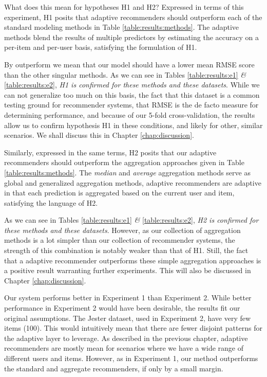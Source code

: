 What does this mean for hypotheses H1 and H2?
Expressed in terms of this experiment,
H1 posits that adaptive recommenders should outperform each of the standard modeling methods
in Table \ref{table:results:methods}.
The adaptive methods blend the results of multiple predictors by estimating the accuracy
on a per-item and per-user basis, satisfying the formulation of H1.

By outperform we mean that our model should have a lower
mean RMSE score than the other singular methods. As we can see in Tables \ref{table:results:e1} \emph{\&} \ref{table:results:e2},
\emph{H1 is confirmed for these methods and these datasets}.
While we can not generalize too much on this basis, 
the fact that this dataset is a common testing ground for recommender systems,
that RMSE is the de facto measure for determining performance,
and because of our 5-fold cross-validation, the results allow us 
to confirm hypothesis H1 in these conditions, and likely for other, similar scenarios.
We shall discuss this in Chapter \ref{chap:discussion}.

Similarly, expressed in the same terms, H2 posits that 
our adaptive recommenders should outperform the aggregation approaches
given in Table \ref{table:results:methods}.
The \emph{median} and \emph{average} aggregation methods
serve as global and generalized aggregation methods,
adaptive recommenders are adaptive in that each prediction is 
aggregated based on the current user and item,
satisfying the language of H2.

As we can see in Tables \ref{table:results:e1} \emph{\&} \ref{table:results:e2},
\emph{H2 is confirmed for these methods and these datasets}.
However, as our collection of aggregation methods is a lot simpler
than our collection of recommender systems, the strength of this combination
is notably weaker than that of H1.
Still, the fact that a adaptive recommender outperforms these simple aggregation
approaches is a positive result warranting further experiments.
This will also be discussed in Chapter \ref{chap:discussion}.

Our system performs better in Experiment 1 than Experiment 2.
While better performance in Experiment 2 would have been desirable,
the results fit our original assumptions.
The Jester dataset, used in Experiment 2, have very few items (100).
This would intuitively mean that there are fewer disjoint
patterns for the adaptive layer to leverage.
As described in the previous chapter, adaptive recommenders
are mostly mean for scenarios where we have a wide range of
different users and items.
However, as in Experiment 1, our method outperforms the standard and aggregate recommenders,
if only by a small margin.

